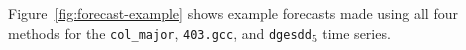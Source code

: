 \documentclass[%
pre,
reprint,
superscriptaddress,
showpacs,
nofootinbib,
nobibnotes,
 amsmath,amssymb,
 aps,
]{revtex4-1}
\newcommand{\gcc}{{\tt 403.gcc}\xspace}
\newcommand{\svdfive}{{\tt dgesdd$_5$}\xspace}
\newcommand{\arima}{{\tt auto.arima}\xspace}
\newcommand{\col}{{\tt col\_major}\xspace}
\begin{document}
Figure~\ref{fig:forecast-example} shows example forecasts made using
all four methods for the \col, \gcc, and \svdfive time series.
%
\end{document}
